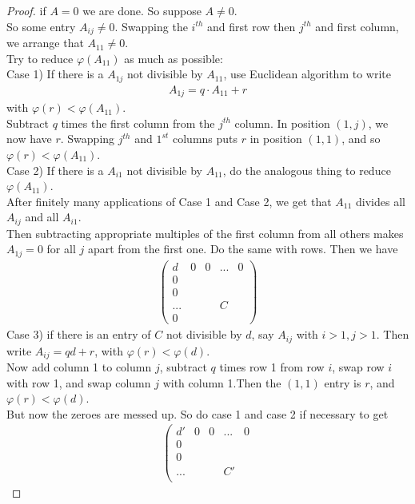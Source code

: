 \documentclass[a4paper]{article}
\begin{document}
\begin{thm}
\begin{proof}
if $A=0$ we are done. So suppose $A \neq 0$.\\
So some entry $A_{ij}\neq 0$. Swapping the $i^{th}$ and first row then $j^{th}$ and first column, we arrange that $A_{11} \neq 0$.\\
Try to reduce $\varphi\left(A_{11}\right)$ as much as possible:\\
Case 1) If there is a $A_{1j}$ not divisible by $A_{11}$, use Euclidean algorithm to write
\begin{equation*}
\begin{aligned}
A_{1j} = q \cdot A_{11} + r
\end{aligned}
\end{equation*}
with $\varphi\left(r\right) < \varphi\left(A_{11}\right)$.\\
Subtract $q$ times the first column from the $j^{th}$ column. In position $\left(1,j\right)$, we now have $r$. Swapping $j^{th}$ and $1^{st}$ columns puts $r$ in position $\left(1,1\right)$, and so $\varphi\left(r\right) < \varphi\left(A_{11}\right)$.\\
Case 2) If there is a $A_{i1}$ not divisible by $A_{11}$, do the analogous thing to reduce $\varphi\left(A_{11}\right)$.\\
After finitely many applications of Case 1 and Case 2, we get that $A_{11}$ divides all $A_{ij}$ and all $A_{i1}$.\\
Then subtracting appropriate multiples of the first column  from all others makes $A_{1j} = 0$ for all $j$ apart from the first one. Do the same with rows. Then we have
\begin{equation*}
\begin{aligned}
\left(
\begin{matrix}
d&0&0&...&0\\
0& & &   &\\
0& & &  &\\
...& & &C &\\
0& & & &
\end{matrix}
\right)
\end{aligned}
\end{equation*}
Case 3) if there is an entry of $C$ not divisible by $d$, say $A_{ij}$ with $i>1, j>1$. Then write $A_{ij} = qd + r$, with $\varphi\left(r\right) < \varphi\left(d\right)$.\\
Now add column 1 to column $j$, subtract $q$ times row 1 from row $i$, swap row $i$ with row 1, and swap column $j$ with column 1.Then the $\left(1,1\right)$ entry is $r$, and $\varphi\left(r\right) < \varphi\left(d\right)$.\\
But now the zeroes are messed up. So do case 1 and case 2 if necessary to get
\begin{equation*}
\begin{aligned}
\left(\begin{matrix}
d'&0&0&...&0\\
0& & &   &\\
0& & &  &\\
...& & & C'&\\


\end{matrix}
\end{aligned}
\end{equation*}
\end{proof}
\end{thm}
\end{document}
